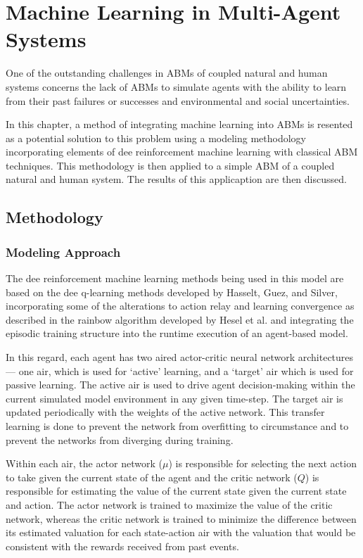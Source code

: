 \chapter{Machine Learning in Multi-Agent Systems}
\label{cha:farm}

One of the outstanding challenges in ABMs of coupled natural and human systems 
concerns the lack of ABMs to simulate agents with the ability to learn from 
their past failures or successes and environmental and social uncertainties.
\cite{sert2020segregation}

In this chapter, a method of integrating machine learning into ABMs is
resented as a potential solution to this problem using
a modeling methodology incorporating elements of dee reinforcement machine
learning with classical ABM techniques.
This methodology is then applied to a simple ABM of a coupled natural and human
system.
The results of this applicaption are then discussed.

\section{Methodology}
\label{sec:farm_methods}

\subsection{Modeling Approach}
\label{subsec:farm_methods_aroach}

The dee reinforcement machine learning methods being used in this model are
based on the dee q-learning methods developed by Hasselt, Guez, and
Silver\cite{ddqn16}, incorporating some of the alterations to action relay
and learning convergence as described in the rainbow algorithm developed by
Hesel et al.\cite{rainbow18} and integrating the episodic training structure
into the runtime execution of an agent-based model.

In this regard, each agent has two aired actor-critic neural network
architectures --- one air, which is used for `active' learning,
and a `target' air which is used for passive learning.
The active air is used to drive agent decision-making within the
current simulated model environment in any given time-step.
The target air is updated periodically with the weights of the active
network.
This transfer learning is done to prevent the network from overfitting 
to circumstance and to prevent the networks from diverging during training.

Within each air, the actor network ($\mu$) is responsible for selecting the
next action to take given the current state of the agent and the critic
network ($Q$) is responsible for estimating the value of the current state
given the current state and action.
The actor network is trained to maximize the value of the critic network,
whereas the critic network is trained to minimize the difference between its
estimated valuation for each state-action air with the valuation that
would be consistent with the rewards received from past events.

